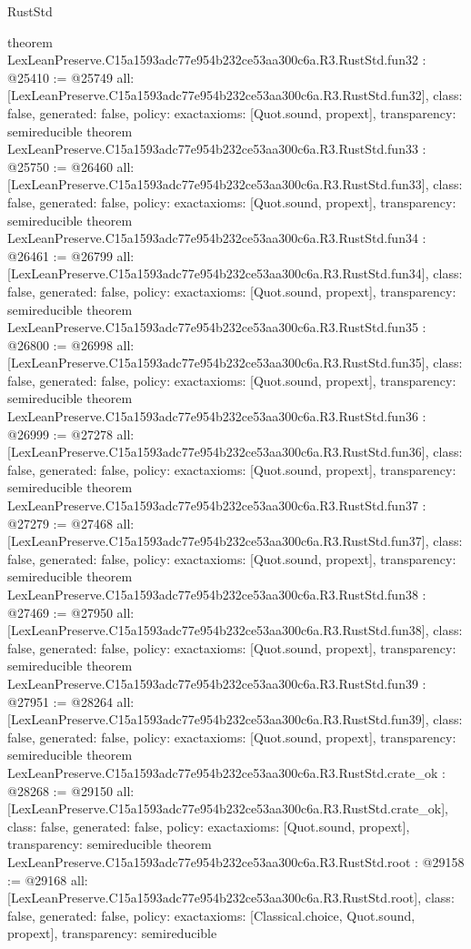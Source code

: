 \begin{lexlean}{RustStd}
\begin{coremodule}
{}
theorem LexLeanPreserve.C15a1593adc77e954b232ce53aa300c6a.R3.RustStd.fun32 : @25410 := @25749 {
  all: [LexLeanPreserve.C15a1593adc77e954b232ce53aa300c6a.R3.RustStd.fun32],
  class: false,
  generated: false,
  policy: exact{axioms: [Quot.sound, propext]},
  transparency: semireducible
}
theorem LexLeanPreserve.C15a1593adc77e954b232ce53aa300c6a.R3.RustStd.fun33 : @25750 := @26460 {
  all: [LexLeanPreserve.C15a1593adc77e954b232ce53aa300c6a.R3.RustStd.fun33],
  class: false,
  generated: false,
  policy: exact{axioms: [Quot.sound, propext]},
  transparency: semireducible
}
theorem LexLeanPreserve.C15a1593adc77e954b232ce53aa300c6a.R3.RustStd.fun34 : @26461 := @26799 {
  all: [LexLeanPreserve.C15a1593adc77e954b232ce53aa300c6a.R3.RustStd.fun34],
  class: false,
  generated: false,
  policy: exact{axioms: [Quot.sound, propext]},
  transparency: semireducible
}
theorem LexLeanPreserve.C15a1593adc77e954b232ce53aa300c6a.R3.RustStd.fun35 : @26800 := @26998 {
  all: [LexLeanPreserve.C15a1593adc77e954b232ce53aa300c6a.R3.RustStd.fun35],
  class: false,
  generated: false,
  policy: exact{axioms: [Quot.sound, propext]},
  transparency: semireducible
}
theorem LexLeanPreserve.C15a1593adc77e954b232ce53aa300c6a.R3.RustStd.fun36 : @26999 := @27278 {
  all: [LexLeanPreserve.C15a1593adc77e954b232ce53aa300c6a.R3.RustStd.fun36],
  class: false,
  generated: false,
  policy: exact{axioms: [Quot.sound, propext]},
  transparency: semireducible
}
theorem LexLeanPreserve.C15a1593adc77e954b232ce53aa300c6a.R3.RustStd.fun37 : @27279 := @27468 {
  all: [LexLeanPreserve.C15a1593adc77e954b232ce53aa300c6a.R3.RustStd.fun37],
  class: false,
  generated: false,
  policy: exact{axioms: [Quot.sound, propext]},
  transparency: semireducible
}
theorem LexLeanPreserve.C15a1593adc77e954b232ce53aa300c6a.R3.RustStd.fun38 : @27469 := @27950 {
  all: [LexLeanPreserve.C15a1593adc77e954b232ce53aa300c6a.R3.RustStd.fun38],
  class: false,
  generated: false,
  policy: exact{axioms: [Quot.sound, propext]},
  transparency: semireducible
}
theorem LexLeanPreserve.C15a1593adc77e954b232ce53aa300c6a.R3.RustStd.fun39 : @27951 := @28264 {
  all: [LexLeanPreserve.C15a1593adc77e954b232ce53aa300c6a.R3.RustStd.fun39],
  class: false,
  generated: false,
  policy: exact{axioms: [Quot.sound, propext]},
  transparency: semireducible
}
theorem LexLeanPreserve.C15a1593adc77e954b232ce53aa300c6a.R3.RustStd.crate_ok : @28268 := @29150 {
  all: [LexLeanPreserve.C15a1593adc77e954b232ce53aa300c6a.R3.RustStd.crate_ok],
  class: false,
  generated: false,
  policy: exact{axioms: [Quot.sound, propext]},
  transparency: semireducible
}
theorem LexLeanPreserve.C15a1593adc77e954b232ce53aa300c6a.R3.RustStd.root : @29158 := @29168 {
  all: [LexLeanPreserve.C15a1593adc77e954b232ce53aa300c6a.R3.RustStd.root],
  class: false,
  generated: false,
  policy: exact{axioms: [Classical.choice, Quot.sound, propext]},
  transparency: semireducible
}


\end{coremodule}
\end{lexlean}
